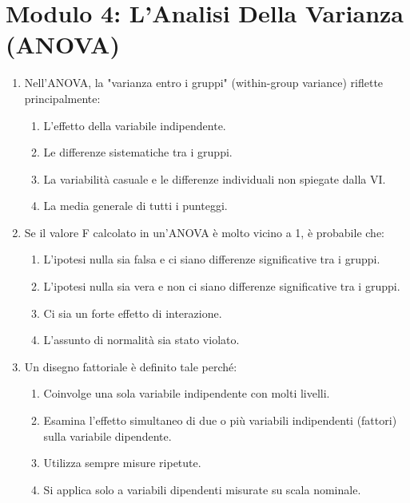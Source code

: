 \documentclass[12pt, a4paper]{article}
\begin{document}
\section*{Modulo 4: L'Analisi Della Varianza (ANOVA)}
\begin{enumerate}[resume]
    \item Nell'ANOVA, la "varianza entro i gruppi" (within-group variance) riflette principalmente:
    \begin{enumerate}
        \item L'effetto della variabile indipendente.
        \item Le differenze sistematiche tra i gruppi.
        \item La variabilità casuale e le differenze individuali non spiegate dalla VI.
        \item La media generale di tutti i punteggi.
    \end{enumerate}
    \vspace{0.3cm}

    \item Se il valore F calcolato in un'ANOVA è molto vicino a 1, è probabile che:
    \begin{enumerate}
        \item L'ipotesi nulla sia falsa e ci siano differenze significative tra i gruppi.
        \item L'ipotesi nulla sia vera e non ci siano differenze significative tra i gruppi.
        \item Ci sia un forte effetto di interazione.
        \item L'assunto di normalità sia stato violato.
    \end{enumerate}
    \vspace{0.3cm}

    \item Un disegno fattoriale è definito tale perché:
    \begin{enumerate}
        \item Coinvolge una sola variabile indipendente con molti livelli.
        \item Esamina l'effetto simultaneo di due o più variabili indipendenti (fattori) sulla variabile dipendente.
        \item Utilizza sempre misure ripetute.
        \item Si applica solo a variabili dipendenti misurate su scala nominale.
    \end{enumerate}
    \vspace{0.3cm}


\end{enumerate}
\end{document}
